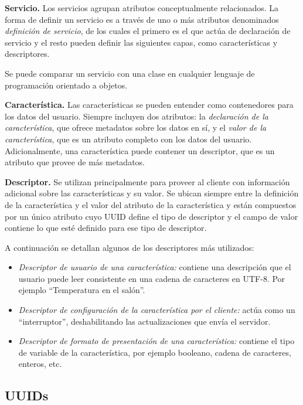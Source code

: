 \textbf{Servicio.} Los servicios agrupan atributos conceptualmente relacionados. La forma de definir un servicio es a través de uno o más atributos denominados \textit{definición de servicio}, de los cuales el primero es el que actúa de declaración de servicio y el resto pueden definir las siguientes capas, como características y descriptores.

Se puede comparar un servicio con una clase en cualquier lenguaje de programación orientado a objetos. 

\textbf{Característica.} Las características se pueden entender como contenedores para los datos del usuario. Siempre incluyen dos atributos: la \textit{declaración de la característica}, que ofrece metadatos sobre los datos en sí, y el \textit{valor de la característica}, que es un atributo completo con los datos del usuario. Adicionalmente, una característica puede contener un descriptor, que es un atributo que provee de más metadatos.

\textbf{Descriptor.} Se utilizan principalmente para proveer al cliente con información adicional sobre las características y su valor. Se ubican siempre entre la definición de la característica y el valor del atributo de la característica y están compuestos por un único atributo cuyo UUID define el tipo de descriptor y el campo de valor contiene lo que esté definido para ese tipo de descriptor.

A continuación se detallan algunos de los descriptores más utilizados:

\begin{itemize}
	\item \textit{Descriptor de usuario de una característica:} contiene una descripción que el usuario puede leer consistente en una cadena de caracteres en UTF-8. Por ejemplo “Temperatura en el salón”.
	\item \textit{Descriptor de configuración de la característica por el cliente:} actúa como un “interruptor”, deshabilitando las actualizaciones que envía el servidor.
	\item \textit{Descriptor de formato de presentación de una característica:} contiene el tipo de variable de la característica, por ejemplo booleano, cadena de caracteres, enteros, etc.
\end{itemize}

\subsection{UUIDs}
\label{makereference2.4.3}

